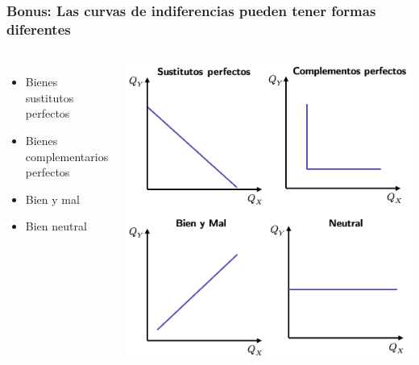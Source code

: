 \documentclass{beamer}
\begin{document}
\begin{frame}
    \frametitle{Bonus: Las curvas de indiferencias pueden tener formas diferentes}
    \begin{columns}
        \begin{itemize}
            \item Bienes sustitutos perfectos
            \item Bienes complementarios perfectos
            \item Bien y mal
            \item Bien neutral
        \end{itemize}
        \includegraphics[scale=0.35]{../Figures/CI_casos.png}
    \end{columns}
\end{frame}
\end{document}
